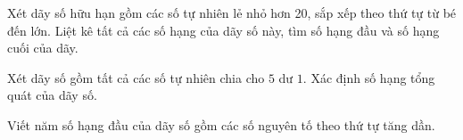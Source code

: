 \begin{bt}%
	Xét dãy số hữu hạn gồm các số tự nhiên lẻ nhỏ hơn 20, sắp xếp theo thứ tự từ bé đến lớn. Liệt kê tất cả các số hạng của dãy số này, tìm số hạng đầu và số hạng cuối của dãy. 
\end{bt}
\begin{bt}%
	Xét dãy số gồm tất cả các số tự nhiên chia cho $5$ dư $1$. Xác định số hạng tổng quát của dãy số.
\end{bt}
\begin{bt}%
	Viết năm số hạng đầu của dãy số gồm các số nguyên tố theo thứ tự tăng dần.
\end{bt}

